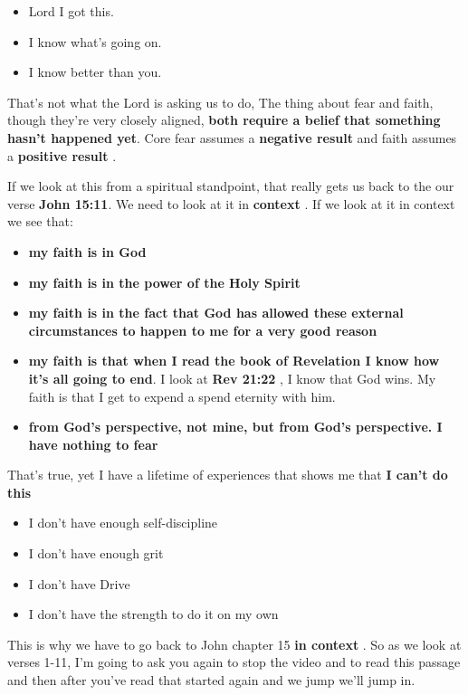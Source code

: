 \documentclass[11pt]{article} %
\begin{document}
\begin{itemize}
\item Lord I got this.
\item I know what's going on.
\item I know better than you.
\end{itemize}

That's not what the Lord is asking us to do, The thing about fear and faith, though they're
very closely aligned, \textbf{both require a belief that something hasn't happened yet}.
Core fear assumes a \textbf{negative result} and faith assumes a \textbf{positive result} .

If we look at this from a spiritual standpoint, that really gets us back to the our verse
\textbf{John 15:11}. We need to look at it in \textbf{context} . If we look at it in context we see that:

\begin{itemize}
\item  \textbf{my faith is in God} 
\item  \textbf{my faith is in the power of the Holy Spirit} 
\item  \textbf{my faith is in the fact that God has allowed these external circumstances to happen
to me for a very good reason} 
\item  \textbf{my faith is that when I read the book of Revelation I know how it's all going to end}.
I look at \textbf{Rev 21:22} , I know that God wins. My faith is that I get to expend a spend eternity
with him.
\item  \textbf{from God's perspective, not mine, but from God's perspective. I have nothing to fear}
\end{itemize}

That's true, yet I have a lifetime of experiences that shows me that \textbf{I can't do this} 

\begin{itemize}
\item  I don't have enough self-discipline
\item  I don't have enough grit
\item  I don't have Drive
\item  I don't have the strength to do it on my own
\end{itemize}

This is why we have to go back to John chapter 15 \textbf{in context} . So as we look at verses 1-11,
I'm going to ask you again to stop the video and to read this passage and then after you've read that
started again and we jump we'll jump in.
\end{document}
